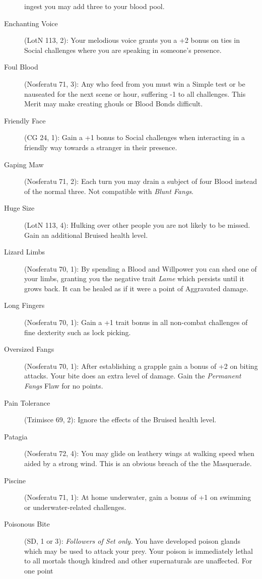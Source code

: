 \begin{description}
	ingest you may add three to your blood pool.
	\item[Enchanting Voice] (LotN 113, 2):  Your melodious voice grants you a +2 bonus 
	on ties in Social challenges where you are speaking in someone's presence.
	\item[Foul Blood] (Nosferatu 71, 3):  Any who feed from you must win a Simple 
	test or be nauseated for the next scene or hour, suffering -1 to all challenges.  This 
	Merit may make creating ghouls or Blood Bonds difficult.
	\item[Friendly Face] (CG 24, 1):  Gain a +1 bonus to Social challenges when interacting 
	in a friendly way towards a stranger in their presence.
	\item[Gaping Maw] (Nosferatu 71, 2):  Each turn you may drain a subject of four 
	Blood instead of the normal three.  Not compatible with \emph{Blunt Fangs}.
	\item[Huge Size] (LotN 113, 4):  Hulking over other people you are not likely 
	to be missed.  Gain an additional Bruised health level.
	\item[Lizard Limbs] (Nosferatu 70, 1):  By spending a Blood and Willpower you 
	can shed one of your limbs, granting you the negative trait \emph{Lame} which 
	persists until it grows back.  It can be healed as if it were a point of 
	Aggravated damage.
	\item[Long Fingers] (Nosferatu 70, 1):  Gain a +1 trait bonus in all non-combat 
	challenges of fine dexterity such as lock picking.
	\item[Oversized Fangs] (Nosferatu 70, 1):  After establishing a grapple gain 
	a bonus of +2 on biting attacks.  Your bite does an extra level of damage. 
	Gain the \emph{Permanent Fangs} Flaw for no points.
	\item[Pain Tolerance] (Tzimisce 69, 2):  Ignore the effects of the Bruised health 
	level.
	\item[Patagia] (Nosferatu 72, 4):  You may glide on leathery wings at walking 
	speed when aided by a strong wind.  This is an obvious breach of the the Masquerade.
	\item[Piscine] (Nosferatu 71, 1):  At home underwater, gain a bonus of +1 on 
	swimming or underwater-related challenges.
	\item[Poisonous Bite] (SD, 1 or 3):  \emph{Followers of Set only.}  You have 
	developed poison glands which may be used to attack your prey.  Your poison is immediately 
	lethal to all mortals though kindred and other supernaturals are unaffected.  For one point 

\end{description}
